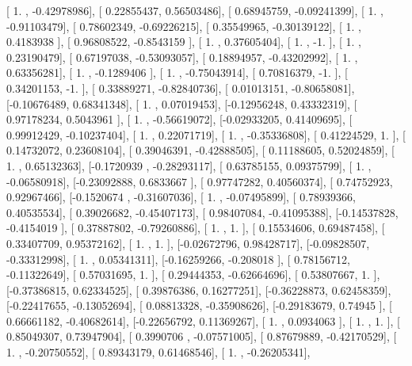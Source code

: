 \documentclass{article}
\begin{document}
       [ 1.        , -0.42978986],
       [ 0.22855437,  0.56503486],
       [ 0.68945759, -0.09241399],
       [ 1.        , -0.91103479],
       [ 0.78602349, -0.69226215],
       [ 0.35549965, -0.30139122],
       [ 1.        ,  0.4183938 ],
       [ 0.96808522, -0.8543159 ],
       [ 1.        ,  0.37605404],
       [ 1.        , -1.        ],
       [ 1.        ,  0.23190479],
       [ 0.67197038, -0.53093057],
       [ 0.18894957, -0.43202992],
       [ 1.        ,  0.63356281],
       [ 1.        , -0.1289406 ],
       [ 1.        , -0.75043914],
       [ 0.70816379, -1.        ],
       [ 0.34201153, -1.        ],
       [ 0.33889271, -0.82840736],
       [ 0.01013151, -0.80658081],
       [-0.10676489,  0.68341348],
       [ 1.        ,  0.07019453],
       [-0.12956248,  0.43332319],
       [ 0.97178234,  0.5043961 ],
       [ 1.        , -0.56619072],
       [-0.02933205,  0.41409695],
       [ 0.99912429, -0.10237404],
       [ 1.        ,  0.22071719],
       [ 1.        , -0.35336808],
       [ 0.41224529,  1.        ],
       [ 0.14732072,  0.23608104],
       [ 0.39046391, -0.42888505],
       [ 0.11188605,  0.52024859],
       [ 1.        ,  0.65132363],
       [-0.1720939 , -0.28293117],
       [ 0.63785155,  0.09375799],
       [ 1.        , -0.06580918],
       [-0.23092888,  0.6833667 ],
       [ 0.97747282,  0.40560374],
       [ 0.74752923,  0.92967466],
       [-0.1520674 , -0.31607036],
       [ 1.        , -0.07495899],
       [ 0.78939366,  0.40535534],
       [ 0.39026682, -0.45407173],
       [ 0.98407084, -0.41095388],
       [-0.14537828, -0.4154019 ],
       [ 0.37887802, -0.79260886],
       [ 1.        ,  1.        ],
       [ 0.15534606,  0.69487458],
       [ 0.33407709,  0.95372162],
       [ 1.        ,  1.        ],
       [-0.02672796,  0.98428717],
       [-0.09828507, -0.33312998],
       [ 1.        ,  0.05341311],
       [-0.16259266, -0.208018  ],
       [ 0.78156712, -0.11322649],
       [ 0.57031695,  1.        ],
       [ 0.29444353, -0.62664696],
       [ 0.53807667,  1.        ],
       [-0.37386815,  0.62334525],
       [ 0.39876386,  0.16277251],
       [-0.36228873,  0.62458359],
       [-0.22417655, -0.13052694],
       [ 0.08813328, -0.35908626],
       [-0.29183679,  0.74945   ],
       [ 0.66661182, -0.40682614],
       [-0.22656792,  0.11369267],
       [ 1.        ,  0.0934063 ],
       [ 1.        ,  1.        ],
       [ 0.85049307,  0.73947904],
       [ 0.3990706 , -0.07571005],
       [ 0.87679889, -0.42170529],
       [ 1.        , -0.20750552],
       [ 0.89343179,  0.61468546],
       [ 1.        , -0.26205341],
\end{document}

